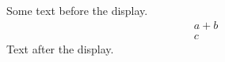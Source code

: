 \documentclass[12pt]{article}
\begin{document}
Some text before the display.
\[ \begin{gathered} a + b \\ c \end{gathered} \]
Text after the display.
\end{document}
